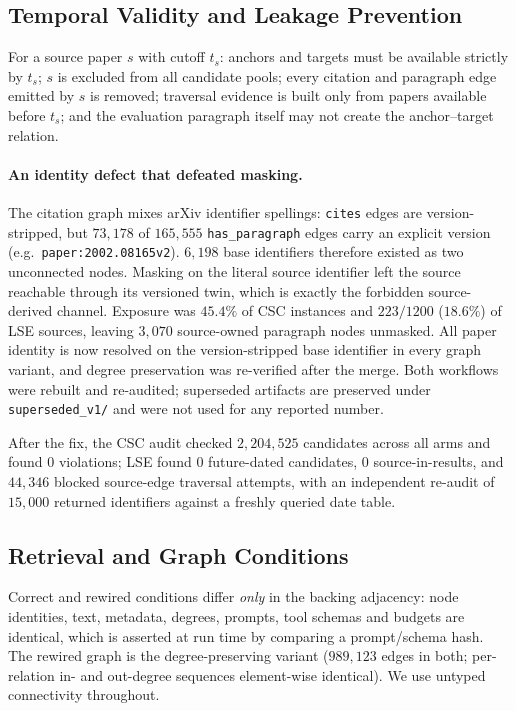 \subsection{Temporal Validity and Leakage Prevention}
\label{appendix:ar-leakage}

For a source paper $s$ with cutoff $t_s$: anchors and targets must be available strictly by $t_s$;
$s$ is excluded from all candidate pools; every citation and paragraph edge emitted by $s$ is
removed; traversal evidence is built only from papers available before $t_s$; and the evaluation
paragraph itself may not create the anchor--target relation.

\paragraph{An identity defect that defeated masking.} The citation graph mixes arXiv identifier
spellings: \texttt{cites} edges are version-stripped, but $73{,}178$ of $165{,}555$
\texttt{has\_paragraph} edges carry an explicit version (e.g.\ \texttt{paper:2002.08165v2}).
$6{,}198$ base identifiers therefore existed as two unconnected nodes. Masking on the literal
source identifier left the source reachable through its versioned twin, which is exactly the
forbidden source-derived channel. Exposure was $45.4\%$ of CSC instances and $223/1200$ ($18.6\%$)
of LSE sources, leaving $3{,}070$ source-owned paragraph nodes unmasked. All paper identity is now
resolved on the version-stripped base identifier in every graph variant, and degree preservation was
re-verified after the merge. Both workflows were rebuilt and re-audited; superseded artifacts are
preserved under \texttt{superseded\_v1/} and were not used for any reported number.

After the fix, the CSC audit checked $2{,}204{,}525$ candidates across all arms and found $0$
violations; LSE found $0$ future-dated candidates, $0$ source-in-results, and $44{,}346$ blocked
source-edge traversal attempts, with an independent re-audit of $15{,}000$ returned identifiers
against a freshly queried date table.

\subsection{Retrieval and Graph Conditions}
\label{appendix:ar-conditions}

Correct and rewired conditions differ \emph{only} in the backing adjacency: node identities, text,
metadata, degrees, prompts, tool schemas and budgets are identical, which is asserted at run time
by comparing a prompt/schema hash. The rewired graph is the degree-preserving variant
($989{,}123$ edges in both; per-relation in- and out-degree sequences element-wise identical). We
use untyped connectivity throughout.

